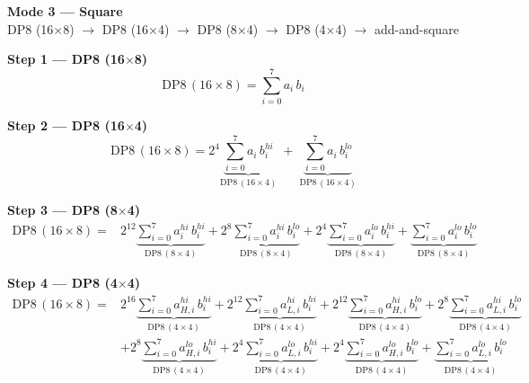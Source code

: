 \documentclass[fleqn]{article}
\newcommand{\DPop}[3]{\mathrm{DP#1}\,(#2\!\times\!#3)}
\begin{document}
\begin{center}
{\LARGE \textbf{Mode 3 --- Square}}\\[4pt]
{\large DP8 (16$\times$8) $\rightarrow$ DP8 (16$\times$4) $\rightarrow$ DP8 (8$\times$4) $\rightarrow$ DP8 (4$\times$4) $\rightarrow$ add-and-square}
\end{center}

\vspace{0.1em}

\textbf{Step 1 --- DP8 (16$\times$8)}
\[
\DPop{8}{16}{8} = \sum_{i=0}^{7} a_i \, b_i
\]

\textbf{Step 2 --- DP8 (16$\times$4)}
\[
\DPop{8}{16}{8}
  = 2^{4}\underbrace{\sum_{i=0}^{7} a_i \, b_i^{hi}}_{\DPop{8}{16}{4}}
  \; + \; \underbrace{\sum_{i=0}^{7} a_i \, b_i^{lo}}_{\DPop{8}{16}{4}}
\]

\textbf{Step 3 --- DP8 (8$\times$4)}
\begin{align*}
\DPop{8}{16}{8} = {}
  & 2^{12}\underbrace{\sum_{i=0}^{7} a_i^{hi} \, b_i^{hi}}_{\DPop{8}{8}{4}}
  + 2^{8}\underbrace{\sum_{i=0}^{7} a_i^{hi} \, b_i^{lo}}_{\DPop{8}{8}{4}}
  + 2^{4}\underbrace{\sum_{i=0}^{7} a_i^{lo} \, b_i^{hi}}_{\DPop{8}{8}{4}}
  + \underbrace{\sum_{i=0}^{7} a_i^{lo} \, b_i^{lo}}_{\DPop{8}{8}{4}}
\end{align*}

\textbf{Step 4 --- DP8 (4$\times$4)}
\begin{align*}
\DPop{8}{16}{8} = {}
  & 2^{16}\underbrace{\sum_{i=0}^{7} a_{H,i}^{hi}\, b_i^{hi}}_{\DPop{8}{4}{4}}
  + 2^{12}\underbrace{\sum_{i=0}^{7} a_{L,i}^{hi}\, b_i^{hi}}_{\DPop{8}{4}{4}}
  + 2^{12}\underbrace{\sum_{i=0}^{7} a_{H,i}^{hi}\, b_i^{lo}}_{\DPop{8}{4}{4}}
  + 2^{8}\underbrace{\sum_{i=0}^{7} a_{L,i}^{hi}\, b_i^{lo}}_{\DPop{8}{4}{4}} \\[0.6em]
  & + 2^{8}\underbrace{\sum_{i=0}^{7} a_{H,i}^{lo}\, b_i^{hi}}_{\DPop{8}{4}{4}}
  + 2^{4}\underbrace{\sum_{i=0}^{7} a_{L,i}^{lo}\, b_i^{hi}}_{\DPop{8}{4}{4}}
  + 2^{4}\underbrace{\sum_{i=0}^{7} a_{H,i}^{lo}\, b_i^{lo}}_{\DPop{8}{4}{4}}
  + \underbrace{\sum_{i=0}^{7} a_{L,i}^{lo}\, b_i^{lo}}_{\DPop{8}{4}{4}}
\end{align*}
\end{document}
